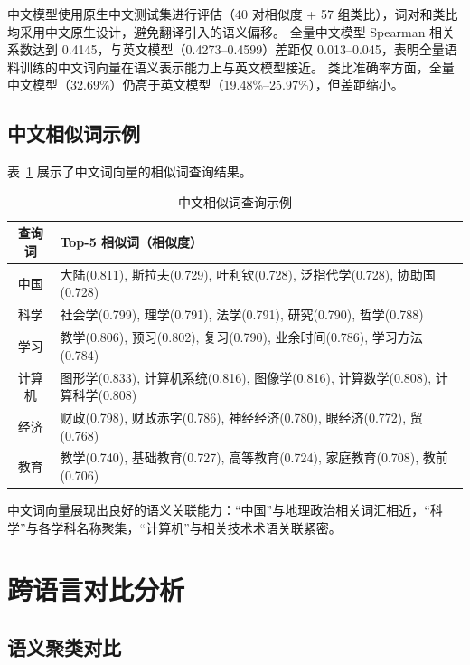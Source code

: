 中文模型使用原生中文测试集进行评估（40 对相似度 + 57 组类比），词对和类比均采用中文原生设计，避免翻译引入的语义偏移。
全量中文模型 Spearman 相关系数达到 0.4145，与英文模型（0.4273--0.4599）差距仅 0.013--0.045，表明全量语料训练的中文词向量在语义表示能力上与英文模型接近。
类比准确率方面，全量中文模型（32.69\%）仍高于英文模型（19.48\%--25.97\%），但差距缩小。

\subsection{中文相似词示例}

表~\ref{tab:chinese_similar} 展示了中文词向量的相似词查询结果。

\begin{table}[htbp]
\centering
\caption{中文相似词查询示例}
\label{tab:chinese_similar}
\begin{tabular}{cl}
\toprule
\textbf{查询词} & \textbf{Top-5 相似词（相似度）} \\
\midrule
中国 & 大陆(0.811), 斯拉夫(0.729), 叶利钦(0.728), 泛指代学(0.728), 协助国(0.728) \\
科学 & 社会学(0.799), 理学(0.791), 法学(0.791), 研究(0.790), 哲学(0.788) \\
学习 & 教学(0.806), 预习(0.802), 复习(0.790), 业余时间(0.786), 学习方法(0.784) \\
计算机 & 图形学(0.833), 计算机系统(0.816), 图像学(0.816), 计算数学(0.808), 计算科学(0.808) \\
经济 & 财政(0.798), 财政赤字(0.786), 神经经济(0.780), 眼经济(0.772), 贸(0.768) \\
教育 & 教学(0.740), 基础教育(0.727), 高等教育(0.724), 家庭教育(0.708), 教前(0.706) \\
\bottomrule
\end{tabular}
\end{table}

中文词向量展现出良好的语义关联能力：``中国''与地理政治相关词汇相近，``科学''与各学科名称聚集，``计算机''与相关技术术语关联紧密。

\section{跨语言对比分析}

\subsection{语义聚类对比}

